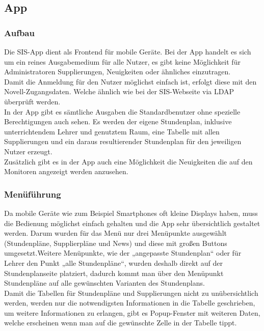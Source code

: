 \subsection{App}
\subsubsection{Aufbau}
Die SIS-App dient als Frontend für mobile Geräte. Bei der App handelt es sich um ein reines Ausgabemedium für alle Nutzer, es gibt keine Möglichkeit für Administratoren Supplierungen, Neuigkeiten oder ähnliches einzutragen.\\
Damit die Anmeldung für den Nutzer möglichst einfach ist, erfolgt diese mit den Novell-Zugangsdaten. Welche ähnlich wie bei der SIS-Webseite via LDAP überprüft werden.\\
In der App gibt es sämtliche Ausgaben die Standardbenutzer ohne spezielle Berechtigungen auch sehen. Es werden der eigene Stundenplan, inklusive unterrichtendem Lehrer und genutztem Raum, eine Tabelle mit allen Supplierungen und ein daraus resultierender Stundenplan für den jeweiligen Nutzer erzeugt.\\
Zusätzlich gibt es in der App auch eine Möglichkeit die Neuigkeiten die auf den Monitoren angezeigt werden anzusehen.\\

\subsubsection{Menüführung}

Da mobile Geräte wie zum Beispiel Smartphones oft kleine Displays haben, muss die Bedienung möglichst einfach gehalten und die App sehr übersichtlich gestaltet werden. Darum wurden für das Menü nur drei Menüpunkte ausgewählt (Stundenpläne, Supplierpläne und News) und diese mit großen Buttons umgesetzt.Weitere Menüpunkte, wie der „angepasste Stundenplan“ oder für Lehrer den Punkt „alle Stundenpläne“, wurden deshalb direkt auf der Stundenplanseite platziert, dadurch kommt man über den Menüpunkt Stundenpläne auf alle gewünschten Varianten des Stundenplans.\\
Damit die Tabellen für Stundenpläne und Supplierungen nicht zu unübersichtlich werden, werden nur die notwendigsten Informationen in die Tabelle geschrieben, um weitere Informationen zu erlangen, gibt es Popup-Fenster mit weiteren Daten, welche erscheinen wenn man auf die gewünschte Zelle in der Tabelle tippt.\\



